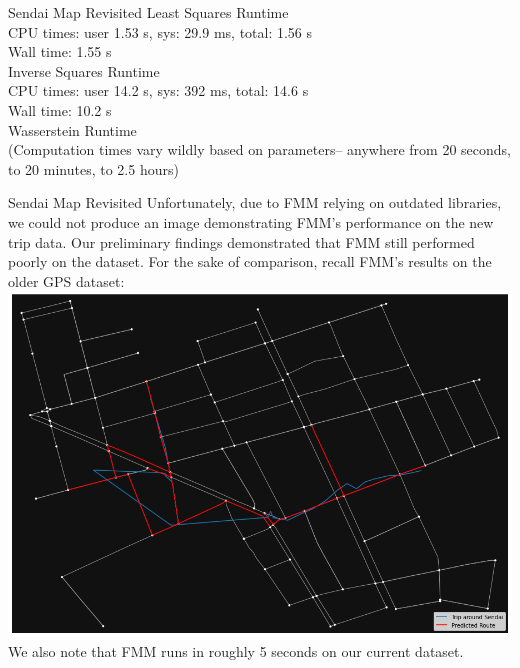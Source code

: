 \documentclass[aspectratio=169, bigfiles]{beamer}
\begin{document}
\begin{frame}{Sendai Map Revisited}
\ttfamily
Least Squares Runtime\\
CPU times: user 1.53 s, sys: 29.9 ms, total: 1.56 s\\
Wall time: 1.55 s\\
\vspace{5mm}
Inverse Squares Runtime\\
CPU times: user 14.2 s, sys: 392 ms, total: 14.6 s\\
Wall time: 10.2 s\\
\vspace{5mm}
Wasserstein Runtime\\
(Computation times vary wildly based on parameters-- anywhere from 20 seconds, to 20 minutes, to 2.5 hours)
  
\end{frame}

\begin{frame}{Sendai Map Revisited}
Unfortunately, due to FMM relying on outdated libraries, we could not produce an image demonstrating FMM's performance on the new trip data. Our preliminary findings demonstrated that FMM still performed poorly on the dataset. For the sake of comparison, recall FMM's results on the older GPS dataset:
\centering
\includegraphics[scale=0.21]{Jupyter Notebook LaTeX/oldfmmresults.png}\\

We also note that FMM runs in roughly 5 seconds on our current dataset.
\end{frame}
\end{document}

